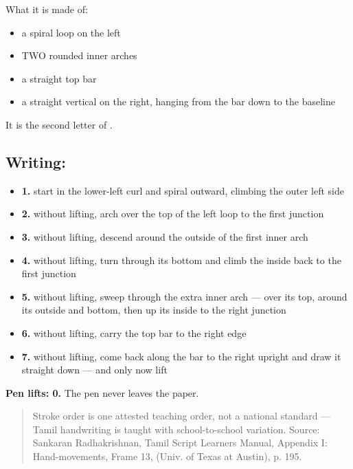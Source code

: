 What it is made of:

\begin{itemize}
\raggedright
  \item a spiral loop on the left
  \item TWO rounded inner arches
  \item a straight top bar
  \item a straight vertical on the right, hanging from the bar down to the baseline
\end{itemize}

It is the second letter of .

\subsection*{Writing: }

\begin{itemize}
\raggedright
  \item \textbf{1.} start in the lower-left curl and spiral outward, climbing the outer left side
  \item \textbf{2.} without lifting, arch over the top of the left loop to the first junction
  \item \textbf{3.} without lifting, descend around the outside of the first inner arch
  \item \textbf{4.} without lifting, turn through its bottom and climb the inside back to the first junction
  \item \textbf{5.} without lifting, sweep through the extra inner arch — over its top, around its outside and bottom, then up its inside to the right junction
  \item \textbf{6.} without lifting, carry the top bar to the right edge
  \item \textbf{7.} without lifting, come back along the bar to the right upright and draw it straight down — and only now lift
\end{itemize}

\textbf{Pen lifts: 0.} The pen never leaves the paper.

\begin{quote}
Stroke order is one attested teaching order, not a national standard — Tamil handwriting is taught with school-to-school variation. Source: Sankaran Radhakrishnan, Tamil Script Learners Manual, Appendix I: Hand-movements, Frame 13,  (Univ. of Texas at Austin), p. 195.
\end{quote}

